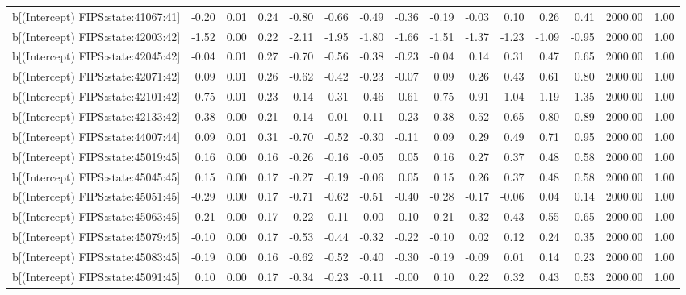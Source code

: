 \begin{table}[ht]
\begin{tabular}{rrrrrrrrrrrrrrr}
  b[(Intercept) FIPS:state:41067:41] & -0.20 & 0.01 & 0.24 & -0.80 & -0.66 & -0.49 & -0.36 & -0.19 & -0.03 & 0.10 & 0.26 & 0.41 & 2000.00 & 1.00 \\ 
  b[(Intercept) FIPS:state:42003:42] & -1.52 & 0.00 & 0.22 & -2.11 & -1.95 & -1.80 & -1.66 & -1.51 & -1.37 & -1.23 & -1.09 & -0.95 & 2000.00 & 1.00 \\ 
  b[(Intercept) FIPS:state:42045:42] & -0.04 & 0.01 & 0.27 & -0.70 & -0.56 & -0.38 & -0.23 & -0.04 & 0.14 & 0.31 & 0.47 & 0.65 & 2000.00 & 1.00 \\ 
  b[(Intercept) FIPS:state:42071:42] & 0.09 & 0.01 & 0.26 & -0.62 & -0.42 & -0.23 & -0.07 & 0.09 & 0.26 & 0.43 & 0.61 & 0.80 & 2000.00 & 1.00 \\ 
  b[(Intercept) FIPS:state:42101:42] & 0.75 & 0.01 & 0.23 & 0.14 & 0.31 & 0.46 & 0.61 & 0.75 & 0.91 & 1.04 & 1.19 & 1.35 & 2000.00 & 1.00 \\ 
  b[(Intercept) FIPS:state:42133:42] & 0.38 & 0.00 & 0.21 & -0.14 & -0.01 & 0.11 & 0.23 & 0.38 & 0.52 & 0.65 & 0.80 & 0.89 & 2000.00 & 1.00 \\ 
  b[(Intercept) FIPS:state:44007:44] & 0.09 & 0.01 & 0.31 & -0.70 & -0.52 & -0.30 & -0.11 & 0.09 & 0.29 & 0.49 & 0.71 & 0.95 & 2000.00 & 1.00 \\ 
  b[(Intercept) FIPS:state:45019:45] & 0.16 & 0.00 & 0.16 & -0.26 & -0.16 & -0.05 & 0.05 & 0.16 & 0.27 & 0.37 & 0.48 & 0.58 & 2000.00 & 1.00 \\ 
  b[(Intercept) FIPS:state:45045:45] & 0.15 & 0.00 & 0.17 & -0.27 & -0.19 & -0.06 & 0.05 & 0.15 & 0.26 & 0.37 & 0.48 & 0.58 & 2000.00 & 1.00 \\ 
  b[(Intercept) FIPS:state:45051:45] & -0.29 & 0.00 & 0.17 & -0.71 & -0.62 & -0.51 & -0.40 & -0.28 & -0.17 & -0.06 & 0.04 & 0.14 & 2000.00 & 1.00 \\ 
  b[(Intercept) FIPS:state:45063:45] & 0.21 & 0.00 & 0.17 & -0.22 & -0.11 & 0.00 & 0.10 & 0.21 & 0.32 & 0.43 & 0.55 & 0.65 & 2000.00 & 1.00 \\ 
  b[(Intercept) FIPS:state:45079:45] & -0.10 & 0.00 & 0.17 & -0.53 & -0.44 & -0.32 & -0.22 & -0.10 & 0.02 & 0.12 & 0.24 & 0.35 & 2000.00 & 1.00 \\ 
  b[(Intercept) FIPS:state:45083:45] & -0.19 & 0.00 & 0.16 & -0.62 & -0.52 & -0.40 & -0.30 & -0.19 & -0.09 & 0.01 & 0.14 & 0.23 & 2000.00 & 1.00 \\ 
  b[(Intercept) FIPS:state:45091:45] & 0.10 & 0.00 & 0.17 & -0.34 & -0.23 & -0.11 & -0.00 & 0.10 & 0.22 & 0.32 & 0.43 & 0.53 & 2000.00 & 1.00 \\ 

\end{tabular}
\end{table}
